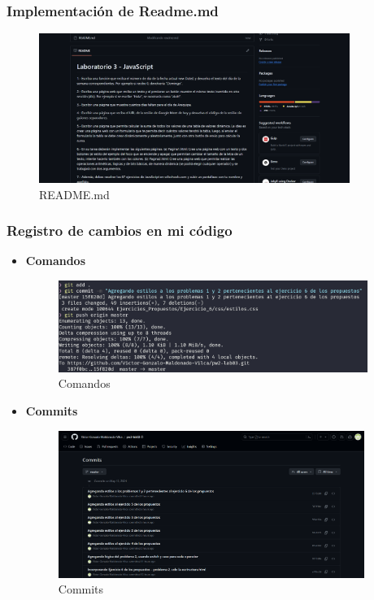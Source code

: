\documentclass{article}
\begin{document}
	\subsubsection{Implementación de Readme.md}
	\begin{figure}[H]
		\centering
		\includegraphics[width=0.9\textwidth,keepaspectratio]{img/readme.png}
		\caption{README.md}
	\end{figure}
	\subsubsection{Registro de cambios en mi código}
	\begin{itemize}
		\item \textbf{Comandos}
		\begin{figure}[H]
			\centering
			\includegraphics[width=0.95\textwidth,keepaspectratio]{img/Comandos.png}
			\caption{Comandos}
		\end{figure}
		\newpage
		\item \textbf{Commits}
		\begin{figure}[H]
			\centering
			\includegraphics[width=0.94\textwidth,keepaspectratio]{img/Commits.png}
			\caption{Commits}
		\end{figure}
	\end{itemize}
	
\end{document}
